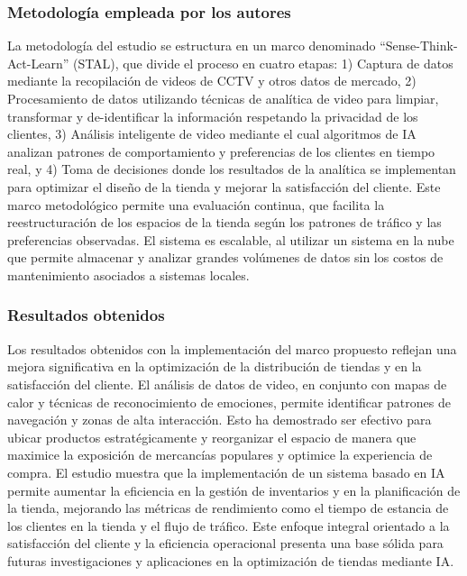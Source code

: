 \subsubsection{Metodología empleada por los autores}
La metodología del estudio se estructura en un marco denominado “Sense-Think-Act-Learn” (STAL), que divide el proceso en cuatro etapas: 1) Captura de datos mediante la recopilación de videos de CCTV y otros datos de mercado, 2) Procesamiento de datos utilizando técnicas de analítica de video para limpiar, transformar y de-identificar la información respetando la privacidad de los clientes, 3) Análisis inteligente de video mediante el cual algoritmos de IA analizan patrones de comportamiento y preferencias de los clientes en tiempo real, y 4) Toma de decisiones donde los resultados de la analítica se implementan para optimizar el diseño de la tienda y mejorar la satisfacción del cliente. Este marco metodológico permite una evaluación continua, que facilita la reestructuración de los espacios de la tienda según los patrones de tráfico y las preferencias observadas. El sistema es escalable, al utilizar un sistema en la nube que permite almacenar y analizar grandes volúmenes de datos sin los costos de mantenimiento asociados a sistemas locales.



\subsubsection{Resultados obtenidos}
Los resultados obtenidos con la implementación del marco propuesto reflejan una mejora significativa en la optimización de la distribución de tiendas y en la satisfacción del cliente. El análisis de datos de video, en conjunto con mapas de calor y técnicas de reconocimiento de emociones, permite identificar patrones de navegación y zonas de alta interacción. Esto ha demostrado ser efectivo para ubicar productos estratégicamente y reorganizar el espacio de manera que maximice la exposición de mercancías populares y optimice la experiencia de compra. El estudio muestra que la implementación de un sistema basado en IA permite aumentar la eficiencia en la gestión de inventarios y en la planificación de la tienda, mejorando las métricas de rendimiento como el tiempo de estancia de los clientes en la tienda y el flujo de tráfico. Este enfoque integral orientado a la satisfacción del cliente y la eficiencia operacional presenta una base sólida para futuras investigaciones y aplicaciones en la optimización de tiendas mediante IA.

